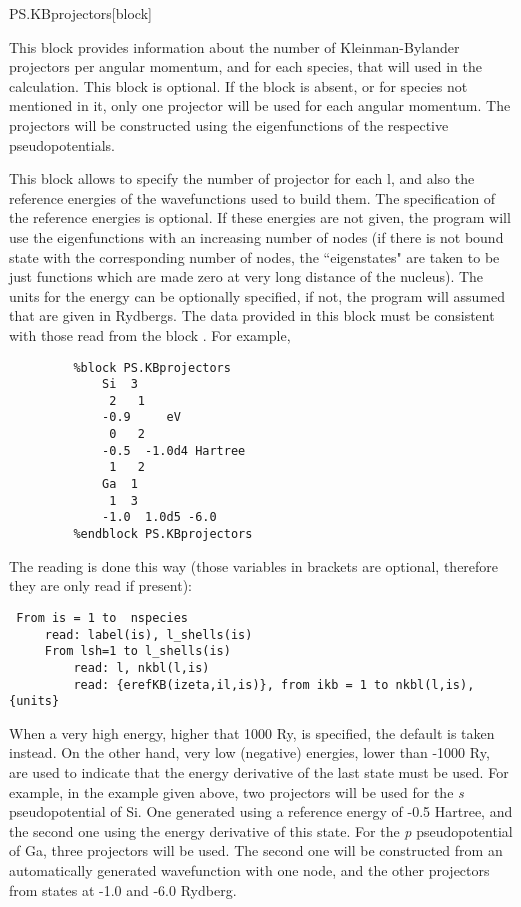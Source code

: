 \begin{fdfentry}{PS.KBprojectors}[block]

This block provides information about the number of Kleinman-Bylander
projectors per angular momentum, and for each species, that will used
in the calculation. This block is optional.
If the block is absent, or for species not mentioned in it, only
one projector will be used for each angular momentum. The projectors
will be constructed using the eigenfunctions of the respective
pseudopotentials.


This block allows to specify the number of projector for each l, and also
the reference energies of the wavefunctions used to build them.
The specification of the reference energies is optional. If these
energies are not given, the program will use the eigenfunctions with an
increasing number of nodes (if there is not bound state with
the corresponding number of nodes, the ``eigenstates" are taken to be just
functions which are made zero at very long distance of the nucleus).
The units for the energy can be optionally specified, if not, the
program will assumed that are given in Rydbergs.
The data provided in this block must be consistent with those
read from the block . For example,

\begin{verbatim}
         %block PS.KBprojectors
             Si  3
              2   1
             -0.9     eV
              0   2
             -0.5  -1.0d4 Hartree
              1   2
             Ga  1
              1  3
             -1.0  1.0d5 -6.0
         %endblock PS.KBprojectors
\end{verbatim}

The reading is done this way (those variables in brackets are optional,
therefore they are only read if
present):

\begin{verbatim}
 From is = 1 to  nspecies
     read: label(is), l_shells(is)
     From lsh=1 to l_shells(is)
         read: l, nkbl(l,is)
         read: {erefKB(izeta,il,is)}, from ikb = 1 to nkbl(l,is), {units}
\end{verbatim}

When a very high energy, higher that 1000 Ry, is specified, the
default is taken instead.  On the other hand, very low (negative)
energies, lower than -1000 Ry, are used to indicate that the energy
derivative of the last state must be used. For example, in the example
given above, two projectors will be used for the \textit{s}
pseudopotential of Si. One generated using a reference energy of -0.5
Hartree, and the second one using the energy derivative of this
state. For the \textit{p} pseudopotential of Ga, three projectors will be
used.  The second one will be constructed from an automatically
generated wavefunction with one node, and the other projectors from
states at -1.0 and -6.0 Rydberg.


\end{fdfentry}
